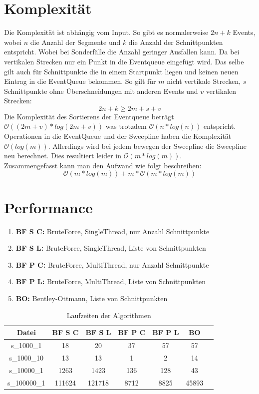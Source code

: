 \documentclass[conference]{IEEEtran}
\begin{document}
	\section{Komplexität}
	Die Komplexität ist abhängig vom Input. So gibt es normalerweise $2n + k$ Events, wobei $n$ die Anzahl der Segmente und $k$ die Anzahl der Schnittpunkten entspricht. Wobei bei Sonderfälle die Anzahl geringer Ausfallen kann. Da bei vertikalen Strecken nur ein Punkt in die Eventqueue eingefügt wird. Das selbe gilt auch für Schnittpunkte die in einem Startpunkt liegen und keinen neuen Eintrag in die EventQueue bekommen. So gilt für $m$ nicht vertikale Strecken, $s$ Schnittpunkte ohne Überschneidungen mit anderen Events und $v$ vertikalen Strecken:
	\[ 2n + k \geq 2m + s + v \]
	Die Komplexität des Sortierens der Eventqueue beträgt $\mathcal{O}((2m+v)*log(2m+v))$ was trotzdem $\mathcal{O}(n*log(n))$ entspricht.\\
	Operationen in die EventQueue und der Sweepline haben die Komplexität $\mathcal{O}(log(m))$. Allerdings wird bei jedem bewegen der Sweepline die Sweepline neu berechnet. Dies resultiert leider in $\mathcal{O}(m*log(m))$.\\
	Zusammengefasst kann man den Aufwand wie folgt beschreiben:
	\[\mathcal{O}(m*log(m)) + m*\mathcal{O}(m*log(m)) \]
	
	\newpage
	
	\section{Performance}
	
	\begin{enumerate}
		\item \textbf{BF S C:} BruteForce, SingleThread, nur Anzahl Schnittpunkte
		\item \textbf{BF S L:} BruteForce, SingleThread, Liste von Schnittpunkten
		\item \textbf{BF P C:} BruteForce, MultiThread, nur Anzahl Schnittpunkte
		\item \textbf{BF P L:} BruteForce, MultiThread, Liste von Schnittpunkten
		\item \textbf{BO:} Bentley-Ottmann, Liste von Schnittpunkten
	\end{enumerate}
     
	\begin{table}
		\small
		\begin{tabular}{|c|c|c|c|c|c|c|}
			\hline
			Datei & BF S C & BF S L & BF P C & BF P L & BO \\
			\hline
			s\_1000\_1 & 18 & 20 & 37 & 57 & 57\\
			\hline
			s\_1000\_10 & 13 & 13 & 1 & 2 & 14\\
			\hline
			s\_10000\_1 & 1263 & 1423 & 136 & 128 & 43\\
			\hline
			s\_100000\_1 & 111624 & 121718 & 8712 & 8825 & 45893\\%
			\hline
		\end{tabular}
	    \caption{Laufzeiten der Algorithmen}
	\end{table}
\end{document}
